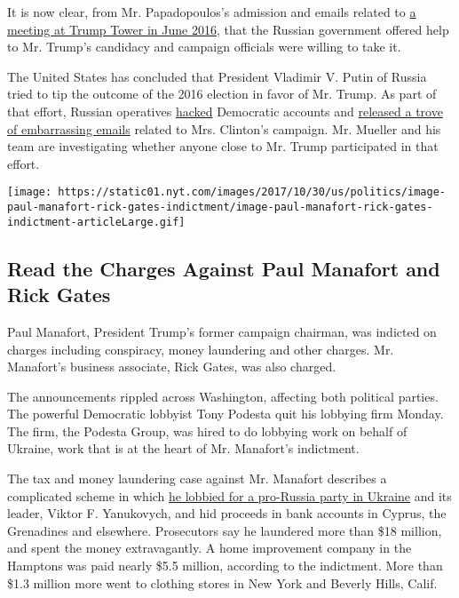 It is now clear, from Mr. Papadopoulos's admission and emails related to
\href{https://www.nytimes.com/2017/07/11/us/politics/trump-russia-email-clinton.html}{a
meeting at Trump Tower in June 2016}, that the Russian government
offered help to Mr. Trump's candidacy and campaign officials were
willing to take it.

The United States has concluded that President Vladimir V. Putin of
Russia tried to tip the outcome of the 2016 election in favor of Mr.
Trump. As part of that effort, Russian operatives
\href{https://www.nytimes.com/2016/06/15/us/politics/russian-hackers-dnc-trump.html}{hacked}
Democratic accounts and
\href{https://www.nytimes.com/2016/07/23/us/politics/dnc-emails-sanders-clinton.html}{released
a trove of embarrassing emails} related to Mrs. Clinton's campaign. Mr.
Mueller and his team are investigating whether anyone close to Mr. Trump
participated in that effort.

\href{https://www.nytimes.com/interactive/2017/10/30/us/politics/document-paul-manafort-rick-gates-indictment.html}{}

\texttt{[image: https://static01.nyt.com/images/2017/10/30/us/politics/image-paul-manafort-rick-gates-indictment/image-paul-manafort-rick-gates-indictment-articleLarge.gif]}

\hypertarget{read-the-charges-against-paul-manafort-and-rick-gates}{%
\subsection{Read the Charges Against Paul Manafort and Rick
Gates}\label{read-the-charges-against-paul-manafort-and-rick-gates}}

Paul Manafort, President Trump's former campaign chairman, was indicted
on charges including conspiracy, money laundering and other charges. Mr.
Manafort's business associate, Rick Gates, was also charged.

The announcements rippled across Washington, affecting both political
parties. The powerful Democratic lobbyist Tony Podesta quit his lobbying
firm Monday. The firm, the Podesta Group, was hired to do lobbying work
on behalf of Ukraine, work that is at the heart of Mr. Manafort's
indictment.

The tax and money laundering case against Mr. Manafort describes a
complicated scheme in which
\href{https://www.nytimes.com/2017/07/15/world/europe/ukraine-paul-manafort-viktor-yanukovych.html}{he
lobbied for a pro-Russia party in Ukraine} and its leader, Viktor F.
Yanukovych, and hid proceeds in bank accounts in Cyprus, the Grenadines
and elsewhere. Prosecutors say he laundered more than \$18 million, and
spent the money extravagantly. A home improvement company in the
Hamptons was paid nearly \$5.5 million, according to the indictment.
More than \$1.3 million more went to clothing stores in New York and
Beverly Hills, Calif.

